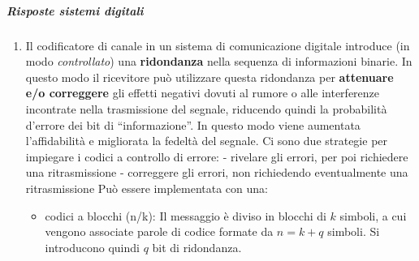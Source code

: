 \documentclass[
]{article}
\providecommand{\tightlist}{%
  \setlength{\itemsep}{0pt}\setlength{\parskip}{0pt}}
\begin{document}
\subparagraph{Risposte sistemi
digitali}\label{risposte-sistemi-digitali}

\begin{enumerate}
\def\labelenumi{\arabic{enumi}.}
\setcounter{enumi}{42}
\item
  Il codificatore di canale in un sistema di comunicazione digitale
  introduce (in modo \emph{controllato}) una \textbf{ridondanza} nella
  sequenza di informazioni binarie. In questo modo il ricevitore può
  utilizzare questa ridondanza per \textbf{attenuare e/o correggere} gli
  effetti negativi dovuti al rumore o alle interferenze incontrate nella
  trasmissione del segnale, riducendo quindi la probabilità d'errore dei
  bit di ``informazione''. In questo modo viene aumentata l'affidabilità
  e migliorata la fedeltà del segnale. \newline Ci sono due strategie
  per impiegare i codici a controllo di errore: - rivelare gli errori,
  per poi richiedere una ritrasmissione - correggere gli errori, non
  richiedendo eventualmente una ritrasmissione Può essere implementata
  con una:

  \begin{itemize}
  \tightlist
  \item
    codici a blocchi (n/k): Il messaggio è diviso in blocchi di \(k\)
    simboli, a cui vengono associate parole di codice formate da
    \(n=k+q\) simboli. Si introducono quindi \(q\) bit di ridondanza.


\end{itemize}
\end{enumerate}
\end{document}
